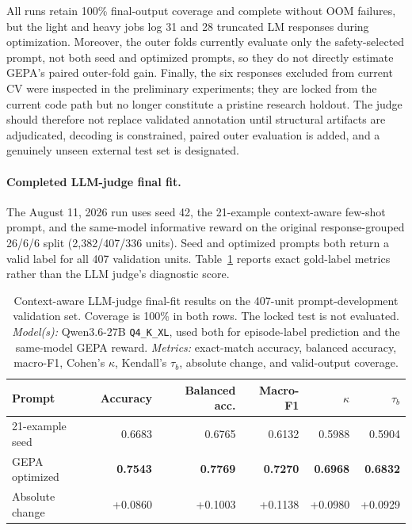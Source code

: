 \documentclass[manuscript,screen,review]{jair}
\newcommand{\modelmetrics}[2]{\textit{Model(s):} #1. \textit{Metrics:} #2.}
\begin{document}
All runs retain 100\% final-output coverage and complete without OOM failures,
but the light and heavy jobs log 31 and 28 truncated LM responses during
optimization.  Moreover, the outer folds currently evaluate only the
safety-selected prompt, not both seed and optimized prompts, so they do not
directly estimate GEPA's paired outer-fold gain.  Finally, the six responses
excluded from current CV were inspected in the preliminary experiments; they
are locked from the current code path but no longer constitute a pristine
research holdout.  The judge should therefore not replace validated annotation
until structural artifacts are adjudicated, decoding is constrained, paired
outer evaluation is added, and a genuinely unseen external test set is
designated.

\paragraph{Completed LLM-judge final fit.}
The August 11, 2026 run uses seed 42, the 21-example context-aware few-shot
prompt, and the same-model informative reward on the original response-grouped
26/6/6 split (2,382/407/336 units).  Seed and optimized prompts both return a
valid label for all 407 validation units.  Table~\ref{tab:exp0a-llmjudge}
reports exact gold-label metrics rather than the LLM judge's diagnostic score.

\begin{table}[t]
\centering
\caption{Context-aware LLM-judge final-fit results on the 407-unit
prompt-development validation set.  Coverage is 100\% in both rows.  The locked test
is not evaluated.  \modelmetrics{Qwen3.6-27B \texttt{Q4\_K\_XL}, used both
for episode-label prediction and the same-model GEPA reward}{exact-match
accuracy, balanced accuracy, macro-F1, Cohen's $\kappa$, Kendall's $\tau_b$,
absolute change, and valid-output coverage}}
\label{tab:exp0a-llmjudge}
\begin{tabular}{lrrrrr}
\toprule
Prompt & Accuracy & Balanced acc. & Macro-F1 & $\kappa$ & $\tau_b$ \\
\midrule
21-example seed & 0.6683 & 0.6765 & 0.6132 & 0.5988 & 0.5904 \\
GEPA optimized  & \textbf{0.7543} & \textbf{0.7769} & \textbf{0.7270} &
\textbf{0.6968} & \textbf{0.6832} \\
\midrule
Absolute change & +0.0860 & +0.1003 & +0.1138 & +0.0980 & +0.0929 \\
\bottomrule
\end{tabular}
\end{table}
\end{document}
